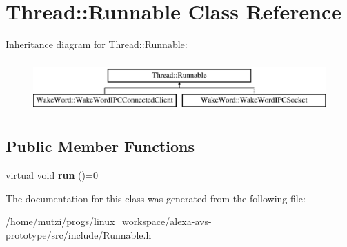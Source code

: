 \hypertarget{classThread_1_1Runnable}{}\section{Thread\+:\+:Runnable Class Reference}
\label{classThread_1_1Runnable}
Inheritance diagram for Thread\+:\+:Runnable\+:\begin{figure}[H]
\begin{center}
\leavevmode
\includegraphics[height=2.000000cm]{df/d39/classThread_1_1Runnable}
\end{center}
\end{figure}
\subsection*{Public Member Functions}
\begin{DoxyCompactItemize}
\item 
\mbox{\label{classThread_1_1Runnable_a334fde08ab60a6f468f587751370b5a7}} 
virtual void {\bfseries run} ()=0
\end{DoxyCompactItemize}


The documentation for this class was generated from the following file\+:\begin{DoxyCompactItemize}
\item 
/home/mutzi/progs/linux\+\_\+workspace/alexa-\/avs-\/prototype/src/include/Runnable.\+h\end{DoxyCompactItemize}
